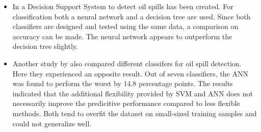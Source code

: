 \begin{itemize}
	
	\item  In \cite{Mera2014} a Decision Support System to detect oil spills has been created. For classification both a neural network and a decision tree are used. Since both classifiers are designed and tested using the same data, a comparison on accuracy can be made. The neural network appears to outperform the decision tree slightly.\cite{Moavenian20103088}
	
	\item  Another study by \cite{Xu2014} also compared different classifers for oil spill detection. Here they experienced an opposite result. Out of seven classifiers, the ANN was found to perform the worst by 14.8 percentage points. The results indicated that the additional flexibility provided by SVM and ANN does not necessarily improve the predicitive performance compared to less flexible methods. Both tend to overfit the dataset on small-sized training samples and could not generalize well.
    

\end{itemize}



	